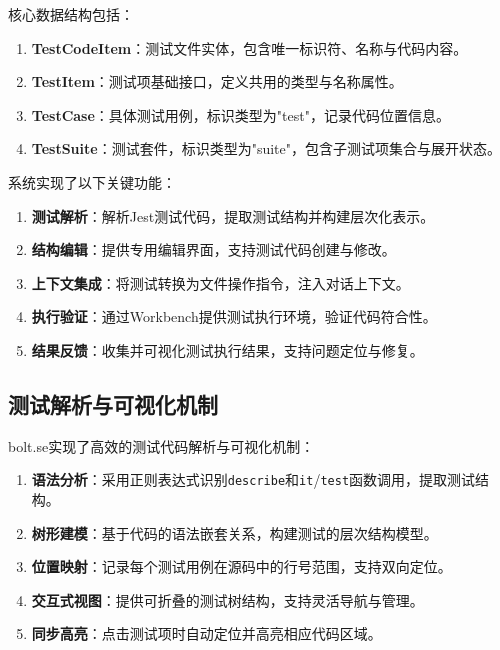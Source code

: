 核心数据结构包括：

\begin{enumerate}
  \item \textbf{TestCodeItem}：测试文件实体，包含唯一标识符、名称与代码内容。
  
  \item \textbf{TestItem}：测试项基础接口，定义共用的类型与名称属性。
  
  \item \textbf{TestCase}：具体测试用例，标识类型为"test"，记录代码位置信息。
  
  \item \textbf{TestSuite}：测试套件，标识类型为"suite"，包含子测试项集合与展开状态。
\end{enumerate}

系统实现了以下关键功能：

\begin{enumerate}
  \item \textbf{测试解析}：解析Jest测试代码，提取测试结构并构建层次化表示。
  
  \item \textbf{结构编辑}：提供专用编辑界面，支持测试代码创建与修改。
  
  \item \textbf{上下文集成}：将测试转换为文件操作指令，注入对话上下文。
  
  \item \textbf{执行验证}：通过Workbench提供测试执行环境，验证代码符合性。
  
  \item \textbf{结果反馈}：收集并可视化测试执行结果，支持问题定位与修复。
\end{enumerate}

\subsection{测试解析与可视化机制}

bolt.se实现了高效的测试代码解析与可视化机制：

\begin{enumerate}
  \item \textbf{语法分析}：采用正则表达式识别\texttt{describe}和\texttt{it}/\texttt{test}函数调用，提取测试结构。
  
  \item \textbf{树形建模}：基于代码的语法嵌套关系，构建测试的层次结构模型。
  
  \item \textbf{位置映射}：记录每个测试用例在源码中的行号范围，支持双向定位。
  
  \item \textbf{交互式视图}：提供可折叠的测试树结构，支持灵活导航与管理。
  
  \item \textbf{同步高亮}：点击测试项时自动定位并高亮相应代码区域。
\end{enumerate}

